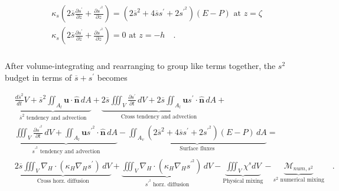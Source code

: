 \documentclass[draft]{agujournal2019}
\begin{document}
\begin{linenomath*}
\begin{align} \label{eq:salt_bcs_sprime_expanded}
\begin{split}
    &  \kappa_s \left(2\overline{s} \frac{\partial s^\prime}{\partial z}+\frac{\partial s^{\prime^2}}{\partial z}\right) = (2\overline{s}^2+4 \overline{s} s^\prime+2s^{\prime^2})(E-P) \,\, \textrm{at} \,\, z = \zeta \\
    &  \kappa_s \left(2\overline{s} \frac{\partial s^\prime}{\partial z} +\frac{\partial s^{\prime^2}}{\partial z}\right) = 0 \,\, \textrm{at} \,\, z = -h \quad . \\
\end{split}
\end{align}
\end{linenomath*}
After volume-integrating and rearranging to group like terms together, the $s^2$ budget in terms of $\overline{s}+s^\prime$ becomes
\begin{linenomath*}
\begin{equation} \label{eq:differences_vint}
    \begin{split}
        & \underbrace{\frac{d \overline{s}^2}{d t} V + \overline{s}^2 \iint_{A_l} \mathbf{u} \cdot \hat{\mathbf{n}} \, dA}_\text{$\overline{s}^2$ tendency and advection}+ \underbrace{2\overline{s} \iiint_V \frac{\partial s^\prime}{\partial t} \, dV+2\overline{s}\iint_{A_l} \mathbf{u}s^{\prime} \cdot \hat{\mathbf{n}} \, dA}_\text{Cross tendency and advection} + \\
        & \underbrace{\iiint_V \frac{\partial s^{\prime^2}}{\partial t} \, dV+\iint_{A_l}  \mathbf{u}s^{\prime^2} \cdot \hat{\mathbf{n}} \, dA}_\text{$s^{\prime^2}$ tendency and advection}-\underbrace{\iint_{A_{v}} (2\overline{s}^2+4 \overline{s} s^\prime+2s^{\prime^2})(E-P) \, dA}_\text{Surface fluxes} = \\ 
        & 
        \underbrace{2 \overline{s} \iiint_{V} \nabla_H \cdot (\kappa_H \nabla_H s^{\prime}) \, dV}_{\text{Cross horz. diffusion}}+
        \underbrace{\iiint_{V} \nabla_H \cdot (\kappa_H \nabla_H s^{\prime^2}) \, dV}_{\text{$s^{\prime^2}$ horz. diffusion}}-\underbrace{\iiint_V \chi^s dV}_\text{Physical mixing} - \underbrace{\mathcal{M}_{num, s^2}}_\text{$s^2$ numerical mixing} \quad . 
\end{split}
\end{equation}
\end{linenomath*}
\end{document}
